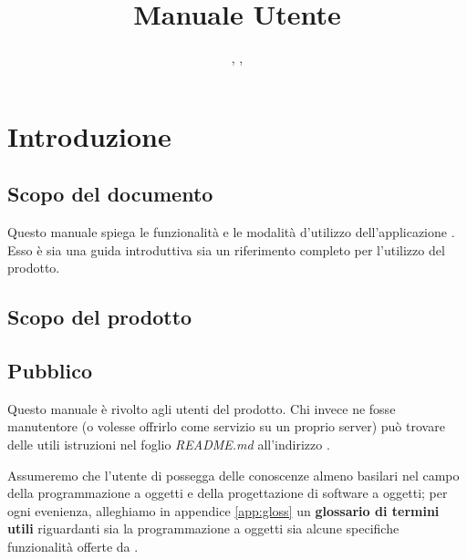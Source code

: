 


\author{\LB, \GG, \PB}
\supervisor{\PB}
\title{Manuale Utente}


\maketitle

\tableofcontents

\renewcommand{\gloss}[1]{#1}






\section{Introduzione}

\subsection{Scopo del documento}
Questo manuale spiega le funzionalità e le modalità d'utilizzo dell'applicazione \proj. Esso è sia una guida introduttiva sia un riferimento completo per l'utilizzo del prodotto.

\subsection{Scopo del prodotto}
\scopo

\subsection{Pubblico}
Questo manuale è rivolto agli utenti del prodotto. Chi invece ne fosse manutentore (o volesse offrirlo come servizio su un proprio server) può trovare delle utili istruzioni nel foglio \emph{README.md} all'indirizzo \repo.

Assumeremo che l'utente di \proj{} possegga delle conoscenze almeno basilari nel campo della programmazione a oggetti e della progettazione di software a oggetti; per ogni evenienza, alleghiamo in appendice \ref{app:gloss} un \textbf{glossario di termini utili} riguardanti sia la programmazione a oggetti sia alcune specifiche funzionalità offerte da \proj.






